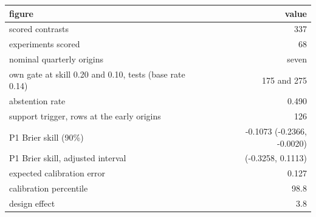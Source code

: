 \begin{tabular}{lr}
\toprule
figure & value \\
\midrule
scored contrasts & 337 \\
experiments scored & 68 \\
nominal quarterly origins & seven \\
own gate at skill 0.20 and 0.10, tests (base rate 0.14) & 175 and 275 \\
abstention rate & 0.490 \\
support trigger, rows at the early origins & 126 \\
P1 Brier skill (90\%) & -0.1073 (-0.2366, -0.0020) \\
P1 Brier skill, adjusted interval & (-0.3258, 0.1113) \\
expected calibration error & 0.127 \\
calibration percentile & 98.8 \\
design effect & 3.8 \\

\end{tabular}
